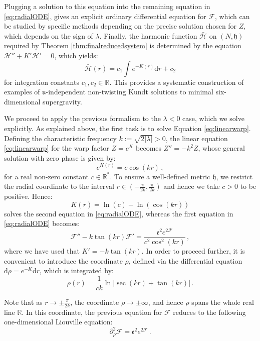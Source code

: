 \documentclass[10pt,a4paper,twoside,reqno]{amsart}
\theoremstyle{plain}
\theoremstyle{definition}
\theoremstyle{remark}
\def\dd{\mathrm{d}}
\def\cH{\mathcal{H}}
\def\cF{\mathcal{F}}
\def\cH{\mathcal{H}}
\def\dd{\mathrm{d}}
\def\fru{\mathfrak{u}}
\begin{document}
\noindent
Plugging a solution to this equation into the remaining equation in \eqref{eq:radialODE}, gives an explicit ordinary differential equation for $\cF$, which can be studied by specific methods depending on the precise solution chosen for $Z$, which depends on the sign of $\lambda$. Finally, the harmonic function $\bar{\cH}$ on $(N, \mathfrak{h})$ required by Theorem \ref{thm:finalreducedsystem} is determined by the equation $\bar{\cH}'' + K' \bar{\cH}' = 0$, which yields:
\begin{equation*}
\bar{\cH}(r) = c_1 \int e^{-K(r)} \dd r + c_2
\end{equation*}
for integration constants $c_1, c_2 \in \mathbb{R}$. This provides a systematic construction of examples of $\fru$-independent non-twisting Kundt solutions to minimal six-dimensional supergravity.\medskip
 
We proceed to apply the previous formalism to the $\lambda < 0$ case, which we solve explicitly. As explained above, the first task is to solve Equation \eqref{eq:linearwarp}. Defining the characteristic frequency $k := \sqrt{2|\lambda|} > 0$, the linear equation \eqref{eq:linearwarp} for the warp factor $Z = e^K$ becomes $Z'' = -k^2 Z$, whose general solution with zero phase is given by:
\begin{equation}
e^{K(r)} = c \cos(kr) \, ,
\end{equation}
for a real non-zero constant $c\in \mathbb{R}^{\ast}$. To ensure a well-defined metric $\mathfrak{h}$, we restrict the radial coordinate to the interval $r \in (-\frac{\pi}{2k}, \frac{\pi}{2k})$ and hence we take $c > 0$ to be positive. Hence:
\begin{equation*}
K(r) = \ln(c) + \ln(\cos(kr))
\end{equation*}
solves the second equation in \eqref{eq:radialODE}, whereas the first equation in \eqref{eq:radialODE} becomes:
\begin{equation*}
 \cF'' -k \tan(kr) \cF' = \frac{\mathfrak{e}^2 e^{2\cF}}{c^2 \cos^2(kr)}\, ,
\end{equation*}
where we have used that $K' = -k \tan(kr)$. In order to proceed further, it is convenient to introduce the coordinate $\rho$, defined via the differential equation $\dd\rho = e^{-K} \dd r$, which is integrated by:
\begin{equation*}
\rho(r) = \frac{1}{c k} \ln \left| \sec(kr) + \tan(kr) \right| \, .
\end{equation*}

\noindent
Note that as $r \to \pm \frac{\pi}{2k}$, the coordinate $\rho \to \pm \infty$, and hence $\rho$ spans the whole real line $\mathbb{R}$. In this coordinate, the previous equation for $\cF$ reduces to the following one-dimensional Liouville equation:
\begin{equation*}
\partial_{\rho}^2 \mathcal{F}= \mathfrak{e}^2 e^{2\mathcal{F}}\, .
\end{equation*}
\end{document}
